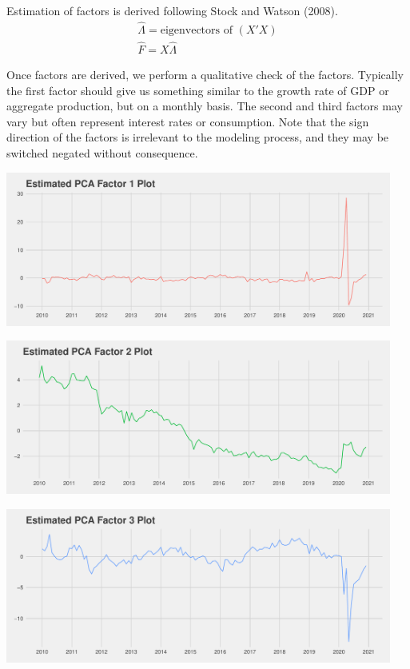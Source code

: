 \documentclass[11pt, letterpaper]{article}\usepackage[]{graphicx}\usepackage[]{color}
\begin{document}
Estimation of factors is derived following Stock and Watson (2008).
\begin{align*}
	\widehat{\Lambda} = \text{eigenvectors of } (X'X)\\
	\widehat{F} = X \widehat{\Lambda}
\end{align*}

Once factors are derived, we perform a qualitative check of the factors. Typically the first factor should give us something similar to the growth rate of GDP or aggregate production, but on a monthly basis. The second and third factors may vary but often represent interest rates or consumption. Note that the sign direction of the factors is irrelevant to the modeling process, and they may be switched negated without consequence. 



{\centering \includegraphics[width=5in,height=2in]{figure/unnamed-chunk-6-1} 

}




{\centering \includegraphics[width=5in,height=2in]{figure/unnamed-chunk-6-2} 

}




{\centering \includegraphics[width=5in,height=2in]{figure/unnamed-chunk-6-3} 

}
\end{document}

